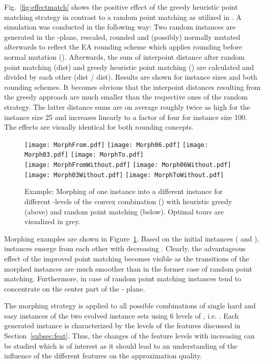\documentclass{article}
\begin{document}
Fig.~\ref{fig:effectmatch} shows the positive effect of the greedy
heuristic point matching strategy in contrast to a random point
matching as utilized in \cite{mersmann2012}. A simulation was
conducted in the following way: Two random instances are generated in
the -plane, rescaled, rounded and (possibly) normally mutated
afterwards to reflect the EA rounding scheme which applies rounding
before normal mutation (). Afterwards, the sum of interpoint
distance after random point matching (dist) and greedy heuristic
point matching () are calculated and divided by each other
(dist / dist). Results are shown for instance sizes
 and both rounding schemes. It becomes obvious that the
interpoint distances resulting from the greedy approach are much
smaller than the respective ones of the random strategy. The latter
distance sums are on average roughly twice as high for the instance
size 25 and increases linearly to a factor of four for instance size
100. The effects are visually identical for both rounding concepts.

\begin{figure}
  \centering
  \texttt{[image: MorphFrom.pdf]}
  \texttt{[image: Morph06.pdf]}
  \texttt{[image: Morph03.pdf]}
  \texttt{[image: MorphTo.pdf]}\\
  \texttt{[image: MorphFromWithout.pdf]}
  \texttt{[image: Morph06Without.pdf]}
  \texttt{[image: Morph03Without.pdf]}
  \texttt{[image: MorphToWithout.pdf]}\\
  \caption{Example: Morphing of one instance into a different instance
    for different -levels of the convex combination ()
    with heuristic greedy (above) and random point matching
    (below). Optimal tours are visualized in grey.}
  \label{fig:morphsketch}
\end{figure}

Morphing examples are shown in Figure~\ref{fig:morphsketch}. Based on
the initial instances ( and ), instances emerge
from each other with decreasing . Clearly, the advantageous
effect of the improved point matching becomes visible as the
transitions of the morphed instances are much smoother than in the
former case of random point matching. Furthermore, in case of random
point matching instances tend to concentrate on the center part of the
 - plane.

The morphing strategy is applied to all possible combinations of single
hard and easy instances of the two evolved instance sets using 6
levels of , i.e. . Each
generated instance is characterized by the levels of the features
discussed in Section~\ref{subsec:feat}. Thus, the changes of the
feature levels with increasing  can be studied which is of
interest as it should lead to an understanding of the influence of the
different features on the approximation quality.
\end{document}
